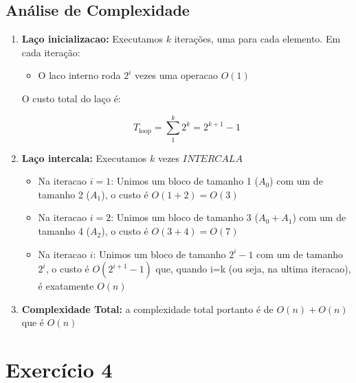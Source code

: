 \documentclass[a4paper,12pt]{article}
\begin{document}
\subsection*{Análise de Complexidade}
\begin{enumerate}    
    \item \textbf{Laço inicializacao:} Executamos $k$ iterações, uma para cada elemento. Em cada iteração:
    
    \begin{itemize}
        \item O laco interno roda $2^i$ vezes uma operacao $O(1)$
    \end{itemize}
    
    O custo total do laço é:
    
    \begin{equation}
    T_{\text{loop}} = \sum_{1}^{k} 2^k = 2^{k+1} - 1
    \end{equation}
    
    \item \textbf{Laço intercala:} Executamos $k$ vezes $INTERCALA$
    \begin{itemize}
        \item Na iteracao $i=1$: Unimos um bloco de tamanho 1 ($A_0$) com um de tamanho 2 ($A_1$), o custo é $O(1 + 2) = O(3)$
        \item Na iteracao $i=2$: Unimos um bloco de tamanho 3 ($A_0 + A_1$) com um de tamanho 4 ($A_2$), o custo é $O(3 + 4) = O(7)$
        \item Na iteracao $i$: Unimos um bloco de tamanho $2^i - 1$ com um de tamanho $2^i$, o custo é $O(2^{i+1} - 1)$ que, quando i=k (ou seja, na ultima iteracao), é exatamente $O(n)$
    \end{itemize}

    \item \textbf{Complexidade Total:} a complexidade total portanto é de $O(n) + O(n)$ que é $O(n)$
\end{enumerate}

\section*{Exercício 4}
\end{document}
